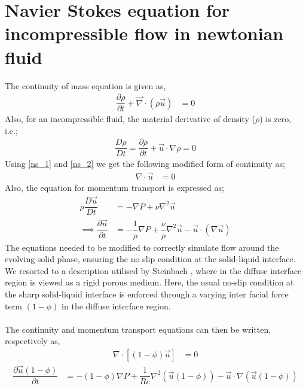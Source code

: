 \documentclass[12pt,a4paper]{report}
\begin{document}
\section{Navier Stokes equation for incompressible flow in newtonian fluid}
The continuity of mass equation is given as,
		\begin{align}
			\dfrac{\partial\rho}{\partial t} + \vec{\nabla}\cdot(\rho\vec{u}) &= 0
			\label{ns_1}
		\end{align}
Also, for an incompressible fluid, the material derivative of density ($\rho$)
	is zero, i.e.;
		\begin{align}
			\dfrac{D\rho}{Dt} = \dfrac{\partial \rho}{\partial t} + \vec{u}\cdot\nabla\rho = 0
			\label{ns_2}
		\end{align}
	Using \ref{ns_1} and \ref{ns_2} we get the following modified form of continuity as;
	\begin{align}
		\nabla\cdot\vec{u} &= 0
		\label{ns_3}
	\end{align}
Also, the equation for momentum transport is expressed as;
	\begin{align}
		\rho\dfrac{D\vec{u}}{D t} &= - \nabla P + \nu\nabla^2\vec{u}\\		
		\implies \dfrac{\partial \vec{u}}{\partial t} &= - \dfrac{1}{\rho}\nabla P + \dfrac{\nu}{\rho}\nabla^2\vec{u} - \vec{u}\cdot\left(\nabla\vec{u}\right)
	\end{align}
The equations needed to be modified to correctly simulate flow around the evolving solid phase, ensuring the no slip condition
at the solid-liquid interface. We resorted to a description utilised by Steinbach \cite{Stein}, where in the diffuse interface region is viewed as a rigid porous medium. Here, the usual no-slip condition at the sharp solid-liquid interface is enforced through a varying inter facial force term $(1-\phi)$ in the diffuse interface region.\\
\\
The continuity and momentum transport equations can then be written, respectively as,
\begin{align}
		\nabla\cdot[(1-\phi)\vec{u}] &= 0
\end{align}
\begin{align}
	\dfrac{\partial \vec{u}(1-\phi)}{\partial t} &= -(1-\phi)\nabla P + \dfrac{1}{Re}\nabla^2\left(\vec{u}(1-\phi)\right) - \vec{u}\cdot\nabla\left(\vec{u}(1-\phi)\right)
\end{align}
\end{document}
